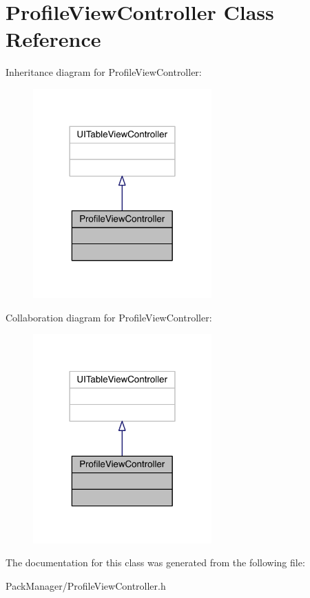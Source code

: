 \hypertarget{interface_profile_view_controller}{\section{Profile\-View\-Controller Class Reference}
\label{interface_profile_view_controller}
}


Inheritance diagram for Profile\-View\-Controller\-:\nopagebreak
\begin{figure}[H]
\begin{center}
\leavevmode
\includegraphics[width=194pt]{interface_profile_view_controller__inherit__graph}
\end{center}
\end{figure}


Collaboration diagram for Profile\-View\-Controller\-:\nopagebreak
\begin{figure}[H]
\begin{center}
\leavevmode
\includegraphics[width=194pt]{interface_profile_view_controller__coll__graph}
\end{center}
\end{figure}


The documentation for this class was generated from the following file\-:\begin{DoxyCompactItemize}
\item 
Pack\-Manager/Profile\-View\-Controller.\-h\end{DoxyCompactItemize}
